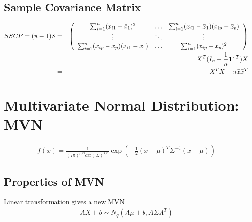 \documentclass[12pt]{extarticle}
\newcommand{\<}{\langle}
\renewcommand{\>}{\rangle}
\theoremstyle{definition}
\begin{document}
\subsection{Sample Covariance Matrix}
\begin{tcolorbox}[enhanced, drop fuzzy shadow, title=Sample Covariance Matrix]
\begin{eqnarray*}
SSCP = (n-1)S &=&
    \left(\begin{array}{ccc}
      \sum^n_{i=1}(x_{i1}-\Bar{x}_1)^2 & \ldots & \sum^n_{i=1}(x_{i1}-\Bar{x}_1)(x_{ip}-\Bar{x}_p) \\
      \vdots & \ddots & \vdots \\
      \sum^n_{i=1}(x_{ip}-\Bar{x}_p)(x_{i1}-\Bar{x}_1) & \ldots & \sum^n_{i=1}(x_{ip}-\Bar{x}_p)^2
    \end{array} \right) \\
&=& X^T (I_n - \frac{1}{n} {\bf 11}^T) X \\
&=& X^T X -n \Bar{x} \Bar{x}^T
\end{eqnarray*}
\end{tcolorbox}

\section{Multivariate Normal Distribution: MVN}
\begin{tcolorbox}[enhanced, drop fuzzy shadow, title=Probability Density Function of Multivariate Normal Distribution]
\begin{eqnarray*}
f(x) = \frac{1}{(2\pi)^{p/2} det(\Sigma)^{1/2}} \exp\left(-\frac{1}{2} (x-\mu)^T \Sigma^{-1} (x-\mu)\right)
\end{eqnarray*}
\end{tcolorbox}


\subsection{Properties of MVN}
\begin{tcolorbox}[enhanced, drop fuzzy shadow, title=Linear Transformation]
Linear transformation gives a new MVN
\begin{eqnarray*}
AX+b \sim N_q(A\mu + b, A\Sigma A^T)
\end{eqnarray*}
\end{tcolorbox}
\end{document}
